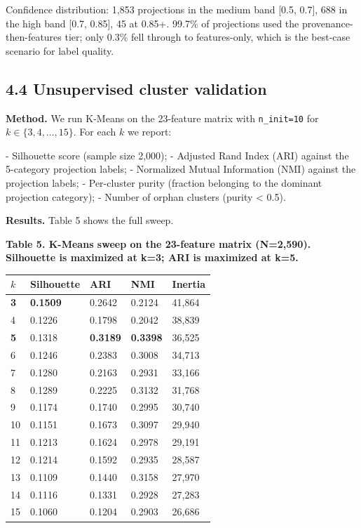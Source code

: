 \documentclass[sigconf,nonacm=false]{acmart}
\begin{document}
Confidence distribution: 1,853 projections in the medium band [0.5, 0.7], 688 in the high band [0.7, 0.85], 45 at 0.85+. 99.7\% of projections used the provenance-then-features tier; only 0.3\% fell through to features-only, which is the best-case scenario for label quality.

\subsection{4.4 Unsupervised cluster validation}

\textbf{Method.} We run K-Means on the 23-feature matrix with \texttt{n\_init=10} for $k \in \{3, 4, \ldots, 15\}$. For each $k$ we report:

- Silhouette score (sample size 2,000);
- Adjusted Rand Index (ARI) against the 5-category projection labels;
- Normalized Mutual Information (NMI) against the projection labels;
- Per-cluster purity (fraction belonging to the dominant projection category);
- Number of orphan clusters (purity < 0.5).

\textbf{Results.} Table 5 shows the full sweep.

\textbf{Table 5. K-Means sweep on the 23-feature matrix (N=2,590). Silhouette is maximized at k=3; ARI is maximized at k=5.}

\begin{table}[h]
\centering
\small
\begin{tabular}{lllll}
\toprule
$k$ & Silhouette & ARI & NMI & Inertia \\
\midrule
\textbf{3} & \textbf{0.1509} & 0.2642 & 0.2124 & 41,864 \\
4 & 0.1226 & 0.1798 & 0.2042 & 38,839 \\
\textbf{5} & 0.1318 & \textbf{0.3189} & \textbf{0.3398} & 36,525 \\
6 & 0.1246 & 0.2383 & 0.3008 & 34,713 \\
7 & 0.1280 & 0.2163 & 0.2931 & 33,166 \\
8 & 0.1289 & 0.2225 & 0.3132 & 31,768 \\
9 & 0.1174 & 0.1740 & 0.2995 & 30,740 \\
10 & 0.1151 & 0.1673 & 0.3097 & 29,940 \\
11 & 0.1213 & 0.1624 & 0.2978 & 29,191 \\
12 & 0.1214 & 0.1592 & 0.2935 & 28,587 \\
13 & 0.1109 & 0.1440 & 0.3158 & 27,970 \\
14 & 0.1116 & 0.1331 & 0.2928 & 27,283 \\
15 & 0.1060 & 0.1204 & 0.2903 & 26,686 \\
\bottomrule
\end{tabular}
\end{table}
\end{document}
